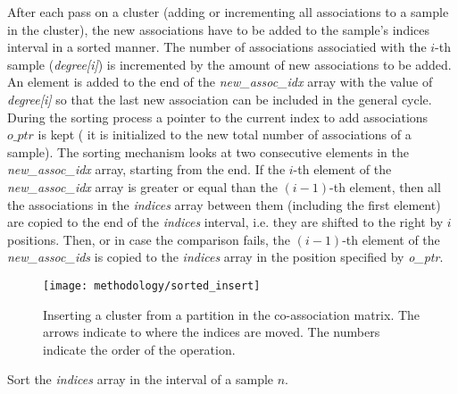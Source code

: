 After each pass on a cluster (adding or incrementing all associations to a sample in the cluster), the new associations have to be added to the sample's indices interval in a sorted manner.
The number of associations associatied with the $i$-th sample (\emph{degree[i]}) is incremented by the amount of new associations to be added.
An element is added to the end of the \emph{new\_assoc\_idx} array with the value of \emph{degree[i]} so that the last new association can be included in the general cycle.
During the sorting process a pointer to the current index to add associations $o\_ptr$ is kept ( it is initialized to the new total number of associations of a sample).
The sorting mechanism looks at two consecutive elements in the \emph{new\_assoc\_idx} array, starting from the end.
If the $i$-th element of the \emph{new\_assoc\_idx} array is greater or equal than the $(i-1)$-th element, then all the associations in the \emph{indices} array between them (including the first element) are copied to the end of the \emph{indices} interval, i.e. they are shifted to the right by $i$ positions.
Then, or in case the comparison fails, the $(i-1)$-th element of the \emph{new\_assoc\_ids} is copied to the \emph{indices} array in the position specified by \emph{o\_ptr}.


\begin{figure}[hbtp]
\centering
\texttt{[image: methodology/sorted\_insert]}
\caption{Inserting a cluster from a partition in the co-association matrix. The arrows indicate to where the indices are moved. The numbers indicate the order of the operation.}
\label{fig:normal part}
\end{figure}



\begin{algorithm}
\caption{Sort the \emph{indices} array in the interval of a sample $n$.}\label{alg:eac csr sort cluster}
\begin{algorithmic}[1]

    \EndWhile
\EndWhile

\EndProcedure
\end{algorithmic}
\end{algorithm}

